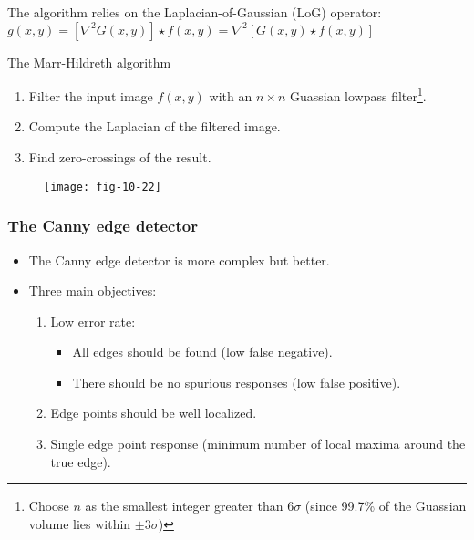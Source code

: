 \begin{frame}
The algorithm relies on the Laplacian-of-Gaussian (LoG) operator:
$
g(x,y) = \left [ \nabla^{2} G(x,y) \right ] \star f(x,y) = \nabla^{2} \left [ G(x,y) \star f(x,y) \right ]
$
\begin{block}{The Marr-Hildreth algorithm}
\begin{enumerate}
\item Filter the input image $f(x,y)$ with an $n\times n$ Guassian lowpass filter\footnote{Choose $n$ as the smallest integer greater than $6\sigma$ (since 99.7\% of the Guassian volume lies within $\pm 3\sigma$)}.
\item Compute the Laplacian of the filtered image.
\item Find zero-crossings of the result.
\end{enumerate}
\end{block}
\end{frame}

\begin{frame}
\begin{figure}[!h]
\texttt{[image: fig-10-22]}
\end{figure}
\end{frame}

\subsubsection{The Canny edge detector}

\begin{frame}
\begin{itemize}
\item The Canny edge detector is more complex but better.
\item Three main objectives:
\begin{enumerate}
\item Low error rate:
\begin{itemize}
\item All edges should be found (low false negative).
\item There should be no spurious responses (low false positive).
\end{itemize}
\item Edge points should be well localized.
\item Single edge point response (minimum number of local maxima around the true edge).
\end{enumerate}
\end{itemize}
\end{frame}

